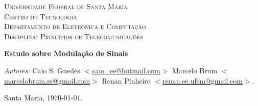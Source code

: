 \begin{titlepage}
\begin{center}

\textsc{\LARGE Universidade Federal de Santa Maria}\\[1.5cm]
\textsc{\Large Centro de Tecnologia}\\[0.5cm]
\textsc{\Large Departamento de Eletrônica e Computação}\\[0.5cm]
\textsc{\Large Disciplina: Princípios de Telecomunicações}\\[0.5cm]
\setlength{\oddsidemargin}{0pt} %
\setlength{\evensidemargin}{0pt} %
\setlength{\textwidth}{15cm}
\end{center}

\vspace*{5cm}
\begin{center}
{\huge \bfseries Estudo sobre Modulação de Sinais}\\[0.4cm]
\end{center}

\vspace*{130px}
\begin{flushright}
\emph{Autores:}
Caio S. Guedes $<$\url{caio_ee@hotmail.com}$>$ \newline
Marcelo Brum $<$\url{marcelobrum.rs@gmail.com}$>$ \newline
Renan Pinheiro $<$\url{renan.ee.ufsm@gmail.com}$>$. \newline



\end{flushright}
\begin{center}
Santa Maria, \today.

\end{center}


\end{titlepage}